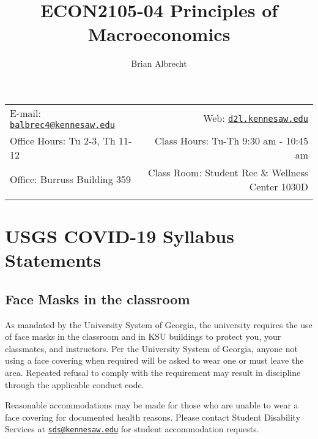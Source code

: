 \documentclass[11pt,]{article}
\title{ECON2105-04 Principles of Macroeconomics}
\author{Brian Albrecht}
\date{}
\begin{document}
  

		\maketitle
		
	
		\thispagestyle{firststyle}



	\noindent \begin{tabular*}{\textwidth}{ @{\extracolsep{\fill}} lr @{\extracolsep{\fill}}}


E-mail: \texttt{\href{mailto:balbrec4@kennesaw.edu}{\nolinkurl{balbrec4@kennesaw.edu}}} & Web: \href{http://d2l.kennesaw.edu}{\tt d2l.kennesaw.edu}\\
Office Hours: Tu 2-3, Th 11-12  &  Class Hours: Tu-Th 9:30 am - 10:45 am\\
Office: Burruss Building 359  & Class Room: Student Rec \& Wellness Center 1030D\\
	&  \\
	\hline
	\end{tabular*}
	
\vspace{2mm}
	


\hypertarget{usgs-covid-19-syllabus-statements}{%
\section{USGS COVID-19 Syllabus Statements}\label{usgs-covid-19-syllabus-statements}}

\hypertarget{face-masks-in-the-classroom}{%
\subsection{Face Masks in the classroom}\label{face-masks-in-the-classroom}}

As mandated by the University System of Georgia, the university requires the use of face masks in the
classroom and in KSU buildings to protect you, your classmates, and instructors. Per the University System of
Georgia, anyone not using a face covering when required will be asked to wear one or must leave the area.
Repeated refusal to comply with the requirement may result in discipline through the applicable conduct code.

Reasonable accommodations may be made for those who are unable to wear a face covering for documented
health reasons. Please contact Student Disability Services at \href{mailto:sds@kennesaw.edu}{\nolinkurl{sds@kennesaw.edu}} for student accommodation
requests.
\end{document}
